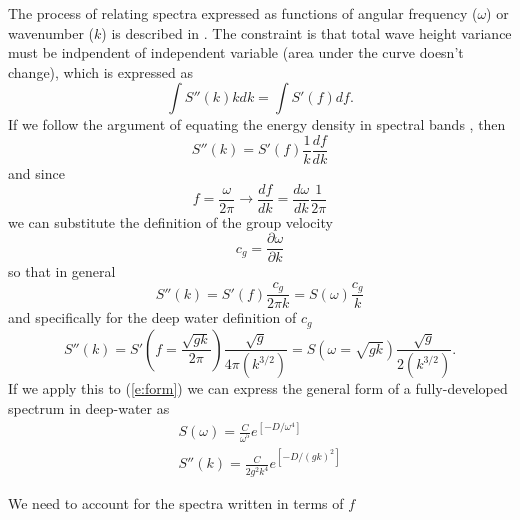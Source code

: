 \documentclass[11pt]{article}
\begin{document}
The process of relating spectra expressed as functions of angular frequency ($\omega$) or wavenumber ($k$) is described in \cite{plant09ocean}.  The constraint is that total wave height variance must be indpendent of independent variable (area under the curve doesn't change), which is expressed as
\[
\int S''(k) k dk = \int S'(f) df.
\]
If we follow the argument of equating the energy density in spectral bands \cite{}, then
\[ S''(k) = S'(f) \frac{1}{k} \frac{df}{dk}\]
and since
\[ f = \frac{\omega}{2 \pi} \rightarrow \frac{df}{dk}=\frac{d\omega}{dk}\frac{1}{2 \pi} \]
we can substitute the definition of the group velocity
\[ c_g = \frac{\partial \omega}{\partial k} \]
so that in general
\[ S''(k) = S'(f) \frac{c_g}{2 \pi k} = S(\omega) \frac{c_g}{k}\]
and specifically for the deep water definition of $c_g$
\[ S''(k) = 
S'\left(f=\frac{\sqrt{gk}}{2\pi}\right) \frac{\sqrt{g}}{4 \pi \left(k^{3/2}\right)} = 
S\left(\omega=\sqrt{gk}\right)\frac{\sqrt{g}}{2 \left(k^{3/2}\right)}.\]
If we apply this to (\ref{e:form}) we can express the general form of a fully-developed spectrum in deep-water as
\begin{eqnarray}
S(\omega) = \frac{C}{\omega^5} e^{\left[ -D/\omega^4 \right]} \\
S''(k) = \frac{C}{2 g^2 k^4} e^{\left[-D/(gk)^2\right]}
\end{eqnarray}

 
We need to account for the spectra written in terms of $f$


\cite{tessendorf99simulating}

\newpage
\setcounter{page}{1}


\end{document}
